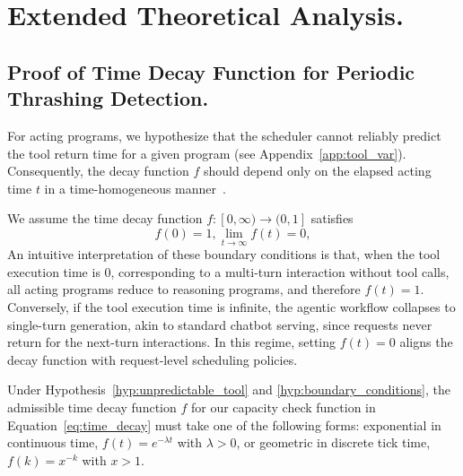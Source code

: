 \newpage
\section{Extended Theoretical Analysis.}

\subsection{Proof of Time Decay Function for Periodic Thrashing Detection.}
\label{app:ft_discussion}


\begin{hypothesis}
\label{hyp:unpredictable_tool}
For acting programs, we hypothesize that the scheduler cannot reliably predict the tool return time for a given program (see Appendix~\ref{app:tool_var}). Consequently, the decay function $f$ should depend only on the elapsed acting time $t$ in a time-homogeneous manner~\cite{parzen1999stochastic}.
\end{hypothesis}


\begin{hypothesis}
\label{hyp:boundary_conditions}
We assume the time decay function $f:[0,\infty)\rightarrow(0,1]$ satisfies
\begin{equation}
f(0) = 1, \lim_{t\to\infty} f(t) = 0,
\label{eq:boundary_f}
\end{equation}
An intuitive interpretation of these boundary conditions is that, when the tool execution time is $0$, corresponding to a multi-turn interaction without tool calls, all acting programs reduce to reasoning programs, and therefore $f(t)=1$. Conversely, if the tool execution time is infinite, the agentic workflow collapses to single-turn generation, akin to standard chatbot serving, since requests never return for the next-turn interactions. In this regime, setting $f(t)=0$ aligns the decay function with request-level scheduling policies.
\end{hypothesis}

\begin{theorem}
\label{thm:admissible_decay}
Under Hypothesis~\ref{hyp:unpredictable_tool} and \ref{hyp:boundary_conditions}, the admissible time decay function $f$ for our capacity check function in Equation~\ref{eq:time_decay} must take one of the following forms: exponential in continuous time, $f(t)=e^{-\lambda t}$ with $\lambda>0$, or geometric in discrete tick time, $f(k)=x^{-k}$ with $x>1$.
\end{theorem}

